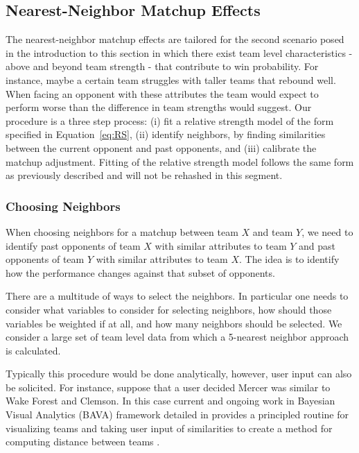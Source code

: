 \subsection{Nearest-Neighbor Matchup Effects}
The nearest-neighbor matchup effects are tailored for the second scenario posed in the introduction to this section in which there exist team level characteristics - above and beyond team strength - that contribute to win probability.  For instance, maybe a certain team struggles with taller teams that rebound well.  When facing an opponent with these attributes the team would expect to perform worse than the difference in team strengths would suggest.  Our procedure is a three step process: (i) fit a relative strength model of the form specified in Equation~\ref{eq:RS}, (ii) identify neighbors, by finding similarities between the current opponent and past opponents, and (iii) calibrate the matchup adjustment.  Fitting of the relative strength model follows the same form as previously described and will not be rehashed in this segment.
\subsubsection{Choosing Neighbors}
When choosing neighbors for a matchup between team $X$ and team $Y$, we need to identify past opponents of team $X$ with similar attributes to team $Y$ and past opponents of team $Y$ with similar attributes to team $X.$  The idea is to identify how the performance changes against that subset of opponents.

There are a multitude of ways to select the neighbors.  In particular one needs to consider what variables to consider for selecting neighbors, how should those variables be weighted if at all, and how many neighbors should be selected.  We consider a large set of team level data from which a 5-nearest neighbor approach is calculated.

Typically this procedure would be done analytically, however, user input can also be solicited.  For instance, suppose that a user decided Mercer was similar to Wake Forest and Clemson.  In this case current and ongoing work in Bayesian Visual Analytics (BAVA) framework detailed in \cite{house2010} provides a principled routine for visualizing teams and taking user input of similarities to create a method for computing distance between teams .  
